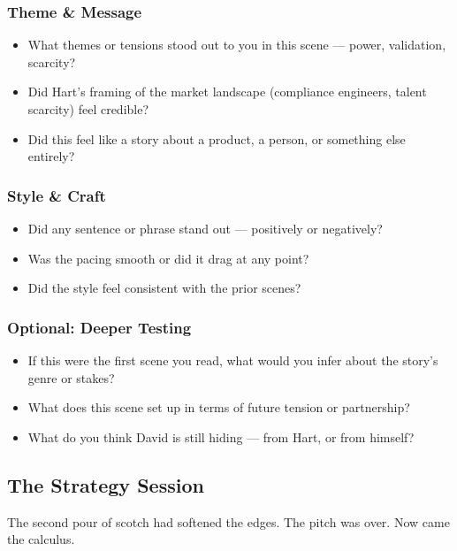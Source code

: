 \subsubsection{Theme \& Message}

\begin{itemize}
  \item What themes or tensions stood out to you in this scene — power, validation, scarcity?
  \item Did Hart’s framing of the market landscape (compliance engineers, talent scarcity) feel credible?
  \item Did this feel like a story about a product, a person, or something else entirely?
\end{itemize}

\subsubsection{Style \& Craft}

\begin{itemize}
  \item Did any sentence or phrase stand out — positively or negatively?
  \item Was the pacing smooth or did it drag at any point?
  \item Did the style feel consistent with the prior scenes?
\end{itemize}

\subsubsection{Optional: Deeper Testing}

\begin{itemize}
  \item If this were the first scene you read, what would you infer about the story’s genre or stakes?
  \item What does this scene set up in terms of future tension or partnership?
  \item What do you think David is still hiding — from Hart, or from himself?
\end{itemize}




\subsection{The Strategy Session}

The second pour of scotch had softened the edges. The pitch was over. Now came the calculus.

